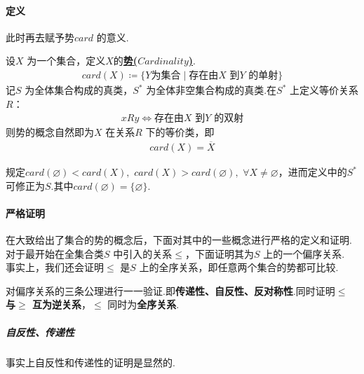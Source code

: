 \vspace*{2em}
\paragraph{定义}
	此时再去赋予势$card$ 的意义.
	\begin{defn}\label{def 1.6.1}
		设$X$ 为一个集合，定义$X$的\underline{\textbf{势($Cardinality$)}}.
		\begin{align}
			card(X) \coloneqq \{ Y \text{为集合} \mid \text{存在由$X$ 到$Y$ 的单射} \}
		\end{align}
		记$S$ 为全体集合构成的真类，$S^*$ 为全体非空集合构成的真类.在$S^*$ 上定义等价关系$R$：
		\begin{align}
			xRy \Leftrightarrow \text{存在由$X$ 到$Y$ 的双射}
		\end{align}
		则势的概念自然即为$X$ 在关系$R$ 下的等价类，即
		\begin{align}
			card(X) = \overline{X}
		\end{align}
		\begin{rmk}
			规定$card(\varnothing) < card(X) , \,\, card(X) > card(\varnothing) , \,\, \forall X \neq \varnothing$，进而定义中的$S^*$ 可修正为$S$.其中$card(\varnothing) = \{ \varnothing \}$.
		\end{rmk}
	\end{defn}

\vspace*{2em}
\paragraph{严格证明}
	在大致给出了集合的势的概念后，下面对其中的一些概念进行严格的定义和证明.\\
	对于最开始在全集合类$S$ 中引入的关系$\leq$，下面证明其为$S$ 上的一个偏序关系.\\
	事实上，我们还会证明$\leq$ 是$S$ 上的全序关系，即任意两个集合的势都可比较.
	
	\vspace*{1em}
	对偏序关系的三条公理进行一一验证.即\textbf{传递性、自反性、反对称性}.同时证明\textbf{$\leq$ 与$\geq$ 互为逆关系}，$\leq$ 同时为\textbf{全序关系}.
	
	\subparagraph{自反性、传递性}
		事实上自反性和传递性的证明是显然的.
		
